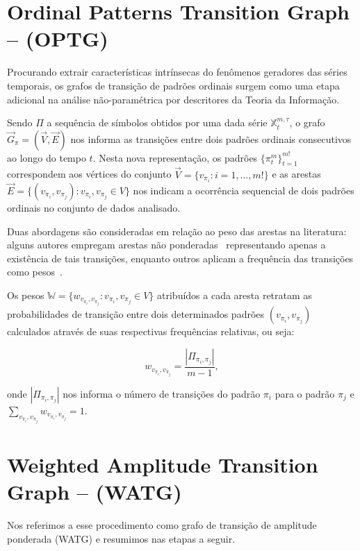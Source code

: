 \documentclass[12pt]{article}
\begin{document}
\section{Ordinal Patterns Transition Graph -- (OPTG)}\label{OPTG}

Procurando extrair características intrínsecas do fenômenos geradores das séries temporais, os grafos de transição de padrões ordinais surgem como uma etapa adicional na análise não-paramétrica por descritores da Teoria da Informação.

Sendo $\Pi$ a sequência de símbolos obtidos por uma dada série $\mathbb{X}_t^{m,\tau}$, o grafo $\vec{G}_{\pi} = (\vec{V}, \vec{E})$ nos informa as transições entre dois padrões ordinais consecutivos ao longo do tempo $t$.
Nesta nova representação, os padrões $\{\pi_t^m\}_{t=1}^{m!}$ correspondem aos vértices do conjunto $\vec{V} = \{ v_{\pi_i}:i = 1, \dots, m!\}$ e as arestas $\vec{E} = \{(v_{\pi_i}, v_{\pi_j}): v_{\pi_i}, v_{\pi_j} \in V\}$ nos indicam a ocorrência sequencial de dois padrões ordinais no conjunto de dados analisado.

Duas abordagens são consideradas em relação ao peso das arestas na literatura: alguns autores empregam arestas não ponderadas~\citep{McCullough2015lagged, Kulp2016ordinal} representando apenas a existência de tais transições, enquanto outros aplicam a frequência das transições como pesos~\citep{Sorrentino2015periodic, Zhang2017ConstructingOP}.


Os pesos $\mathbb{W} = \{w_{v_{\pi_i}, v_{\pi_j}}: v_{\pi_i}, v_{\pi_j} \in V\}$  atribuídos a cada aresta retratam as probabilidades de transição entre dois determinados padrões  $(v_{\pi_i}, v_{\pi_j})$ calculados através de suas respectivas frequências relativas, ou seja:

\begin{equation}
    w_{v_{\pi_i}, v_{\pi_j}} = \frac{|\Pi_{\pi_i,\pi_j}|}{m-1},
\end{equation}

onde $|\Pi_{\pi_i,\pi_j}|$ nos informa o número de transições do padrão $\pi_i$ para o padrão $\pi_j$ e $\sum_{v_{\pi_i}, v_{\pi_j}}w_{v_{\pi_i}, v_{\pi_j}} = 1$.

\section{Weighted Amplitude Transition Graph -- (WATG)}\label{WATG}

Nos referimos a esse procedimento como grafo de transição de amplitude ponderada (WATG) e resumimos nas etapas a seguir. 
\end{document}
